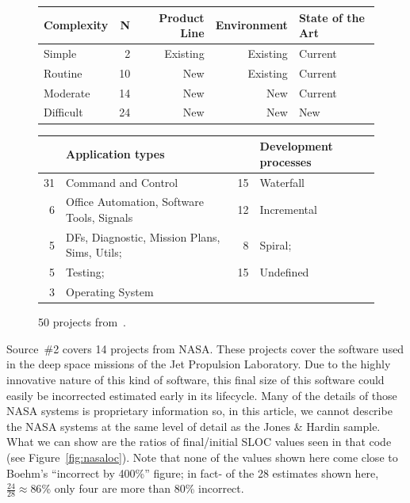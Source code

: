 \documentclass[final,twocolumn,5p]{elsarticle}
\newcommand{\fig}[1]{Figure~\ref{fig:#1}}
\theoremstyle{break}
\begin{document}
\begin{figure}
  \scriptsize
  \begin{center}
      \begin{tabular}{|p{0.77in}|r|r|r|p{0.77in}|}\hline
      Complexity & N &  Product Line  & Environment & State of the Art\\\hline
Simple& 2& Existing& Existing &Current\\
Routine& 10& New& Existing& Current\\
Moderate& 14& New& New& Current\\
Difficult& 24& New& New& New\\\hline
   \end{tabular}

      \vspace{4mm}
      
  \begin{tabular}{|rl|rl|}\hline
        &Application types & &Development processes\\\hline
     31 &Command and Control & 15 &Waterfall\\
    6 &Office Automation, Software Tools, Signals & 12 &Incremental\\
    5 &DFs, Diagnostic, Mission Plans, Sims, Utils; &  8 &Spiral;\\
   5 &Testing; & 15 &Undefined\\
   3 &\multicolumn{3}{l|}{Operating System} \\\hline
  \end{tabular}
  \end{center}
  \caption{50 projects from~\cite{jones07a}.}\label{fig:jones}
  \end{figure}  
Source~\#2 covers 14 projects  from NASA. These projects cover the software used in the deep space
missions of the Jet Propulsion Laboratory. Due to the highly innovative nature of this kind of
software, this final size of this software could easily be incorrected estimated early in its lifecycle.
Many of the details of those NASA systems is proprietary information so, in this article, we cannot describe
the NASA systems at the same level of detail as the Jones \& Hardin sample. What we can show are the ratios
of final/initial SLOC values seen in that code (see \fig{nasaloc}).
 Note
        that none of the values shown here come close to Boehm's ``incorrect by 400\%'' figure;
        in fact- of the 28 estimates shown here, $\frac{24}{28}\approx 86$\%
        only four are more than 80\% incorrect.
\end{document}

